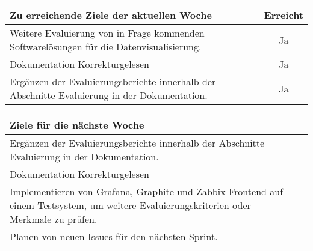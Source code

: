 \begin{tabularx}{\textwidth}{Xc}
    \arrayrulecolor{OliveGreen}
    \toprule
    {\bfseries Zu erreichende Ziele der aktuellen Woche} & {\bfseries Erreicht} \\
    \midrule[2pt]
    Weitere Evaluierung von in Frage kommenden Softwarelösungen für die
    Datenvisualisierung.  &Ja               \\
    \rowcolor{OliveGreen!15}
    Dokumentation Korrekturgelesen                         &Ja               \\
    \rowcolor{White}
    Ergänzen der Evaluierungsberichte innerhalb der Abschnitte Evaluierung in
    der Dokumentation.  &Ja    \\
    \bottomrule[2pt]
\end{tabularx}
%
\vspace{1cm}
%
\begin{tabularx}{\textwidth}{Xc}
    \arrayrulecolor{OliveGreen}
    \toprule
    {\bfseries Ziele für die nächste Woche}        &                         \\
    \midrule[2pt]
    Ergänzen der Evaluierungsberichte innerhalb der Abschnitte Evaluierung in
    der Dokumentation.  &          \\
    \rowcolor{OliveGreen!15}
    Dokumentation Korrekturgelesen                &                          \\
    \rowcolor{White}
    Implementieren von Grafana, Graphite und Zabbix\hyp{}Frontend auf einem
    Testsystem, um weitere Evaluierungskriterien oder Merkmale zu prüfen. & \\
    \rowcolor{OliveGreen!15}
    Planen von neuen Issues für den nächsten Sprint. & \\
\end{tabularx}

